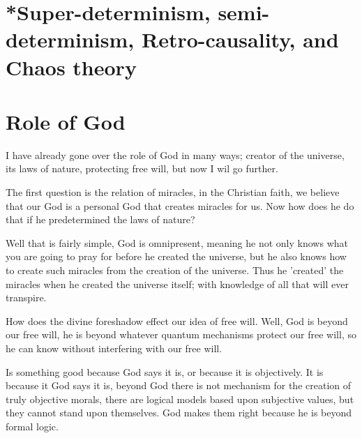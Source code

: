 \section{*Super-determinism, semi-determinism, Retro-causality, and Chaos theory}
\section{Role of God}
\par I have already gone over the role of God in many ways; creator of the universe, its laws of nature, protecting free will, but now I wil go further.
\par The first question is the relation of miracles, in the Christian faith, we believe that our God is a personal God that creates miracles for us. Now how does he do that if he predetermined the laws of nature?
\par Well that is fairly simple, God is omnipresent, meaning he not only knows what you are going to pray for before he created the universe, but he also knows how to create such miracles from the creation of the universe. Thus he 'created' the miracles when he created the universe itself; with knowledge of all that will ever transpire.
\par How does the divine foreshadow effect our idea of free will. Well, God is beyond our free will, he is beyond whatever quantum mechanisms protect our free will, so he can know without interfering with our free will.
\par Is something good because God says it is, or because it is objectively. It is because it God says it is, beyond God there is not mechanism for the creation of truly objective morals, there are logical models based upon subjective values, but they cannot stand upon themselves. God makes them right because he is beyond formal logic.
